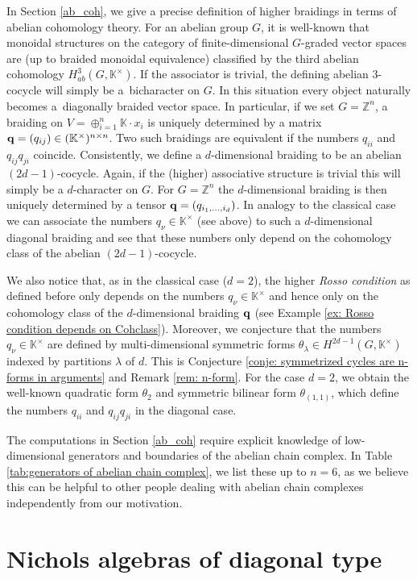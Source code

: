 \documentclass[10pt,a4paper]{amsart}
\numberwithin{equation}{section}
\newcommand{\ZZ }{\mathbb{Z}}
\newcommand{\qq }{{\bf q}}
\newcommand{\KK }{\mathbb{K}}
\begin{document}
In Section \ref{ab_coh}, we give a precise definition of higher braidings in terms of abelian cohomology theory.
For an abelian group $G$, it is well-known that monoidal structures on the category of finite-dimensional $G$-graded vector spaces are (up to braided monoidal equivalence) classified by the third abelian cohomology $H_{ab}^3(G,\KK^\times)$.
If the associator is trivial, the defining abelian $3$-cocycle will simply be a~bicharacter on $G$. In this situation every object naturally becomes a~diagonally braided vector space.
In particular, if we set $G=\ZZ^n$, a braiding on $V=\oplus_{i=1}^n \KK \cdot x_i$ is uniquely determined by a matrix $\qq=(q_{ij})\in (\KK^\times)^{n \times n}$.
Two such braidings are equivalent if the numbers $q_{ii}$ and $q_{ij}q_{ji}$ coincide.
Consistently, we define a $d$-dimensional braiding to be an abelian $(2d-1)$-cocycle. Again, if the (higher) associative structure is trivial this will simply be a $d$-character on $G$. For $G=\ZZ^n$ the $d$-dimensional braiding is then
uniquely determined by a tensor $\qq=(q_{i_1,\dots,i_d})$. In analogy to the classical case we can associate the numbers $q_\nu \in \KK^\times$ (see above) to such a $d$-dimensional diagonal braiding and see that these numbers only depend on the cohomology class of the abelian $(2d-1)$-cocycle.

We also notice that, as in the classical case ($d=2$), the higher \textit{Rosso condition} as defined before only depends on the numbers $q_\nu \in \KK^\times$ and hence only on the cohomology class of the $d$-dimensional braiding $\qq$ (see Example \ref{ex: Rosso condition depends on Cohclass}). Moreover, we conjecture that the numbers $q_\nu \in \KK^\times$ are defined by multi-dimensional symmetric forms $\theta_\lambda \in H^{2d-1}(G,\KK^\times)$ indexed by partitions $\lambda$ of $d$. This is Conjecture \ref{conje: symmetrized cycles are n-forms in arguments} and Remark \ref{rem: n-form}. For the case $d=2$, we obtain the well-known quadratic form $\theta_2$ and symmetric bilinear form $\theta_{(1,1)}$, which define the numbers $q_{ii}$ and $q_{ij}q_{ji}$ in the diagonal case.

The computations in Section \ref{ab_coh} require explicit knowledge of low-dimensional generators and boundaries of the abelian chain complex. In Table \ref{tab:generators of abelian chain complex}, we list these up to $n=6$, as we believe this can be helpful to other people dealing with abelian chain complexes independently from our motivation.

\section{Nichols algebras of diagonal type}
\end{document}
